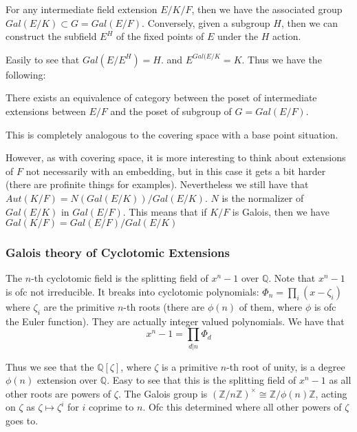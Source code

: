 \documentclass[main.tex]{subfiles}
\begin{document}
For any intermediate field extension $E/K/F$, then we have the associated group $Gal(E/K) \subset G = Gal(E/F)$. Conversely, given a subgroup $H$, then we can construct the subfield $E^H$ of the fixed points of $E$ under the $H$ action. 

Easily to see that $Gal(E/E^H) = H$. and $E^{Gal(E/K} = K$. Thus we have the following:

\begin{theorem}
There exists an equivalence of category between the poset of intermediate extensions between $E/F$ and the poset of subgroup of $G = Gal(E/F)$.
\end{theorem}

\begin{remark}
This is completely analogous to the covering space with a base point situation.
\end{remark}

However, as with covering space, it is more interesting to think about extensions of $F$ not necessarily with an embedding, but in this case it gets a bit harder (there are profinite things for examples). Nevertheless we still have that $Aut (K/F) = N(Gal (E/K))/Gal (E/K)$. $N$ is the normalizer of $Gal(E/K)$ in $Gal(E/F)$. This means that if $K/F$ is Galois, then we have $Gal (K/F) = Gal(E/F) / Gal(E/K)$



\subsubsection{Galois theory of Cyclotomic Extensions}
The $n$-th cyclotomic field is the splitting field of $x^n-1$ over $\mathbb{Q}$. Note that $x^n -1$ is ofc not irreducible. It breaks into cyclotomic polynomials: 
$\Phi_n = \prod_{i} (x - \zeta_i)$ where $\zeta_i$ are the primitive $n$-th roots (there are $\phi(n)$ of them, where $\phi$ is ofc the Euler function). They are actually integer valued polynomials. We have that 
$$
x^n - 1 = \prod_{d | n} \Phi_d
$$

Thus we see that the $\mathbb{Q}[\zeta]$, where $\zeta$ is a primitive $n$-th root of unity,  is a degree $\phi(n)$ extension over $\mathbb{Q}$. Easy to see that this is the splitting field of $x^n -1$ as all other roots are powers of $\zeta$. The Galois group is $(\mathbb{Z}/n\mathbb{Z})^\times \cong \mathbb{Z}/\phi(n)\mathbb{Z}$, acting on $\zeta$ as $\zeta \mapsto \zeta^i$ for $i$ coprime to $n$. Ofc this determined where all other powers of $\zeta$ goes to.
\end{document}
